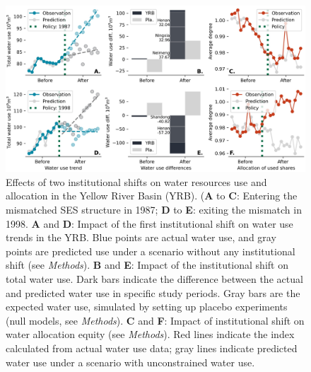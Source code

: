 \documentclass{article}
\begin{document}
\begin{figure}
    \centering
    \includegraphics[width=12cm]{../../../figs/outputs/main_results.jpg}
    \caption{
        Effects of two institutional shifts on water resources use and allocation in the Yellow River Basin (YRB). (\textbf{A} to \textbf{C}: Entering the mismatched SES structure in 1987; \textbf{D} to \textbf{E}: exiting the mismatch in 1998. \textbf{A} and \textbf{D}: Impact of the first institutional shift on water use trends in the YRB. Blue points are actual water use, and gray points are predicted use under a scenario without any institutional shift (see \textit{Methods}). \textbf{B} and \textbf{E}: Impact of the institutional shift on total water use. Dark bars indicate the difference between the actual and predicted water use in specific study periods. Gray bars are the expected water use, simulated by setting up placebo experiments (null models, see \textit{Methods}). \textbf{C} and \textbf{F}: Impact of institutional shift on water allocation equity (see \textit{Methods}). Red lines indicate the index calculated from actual water use data; gray lines indicate predicted water use under a scenario with unconstrained water use.
    }
    \label{fig:main_results}
\end{figure}
\end{document}
